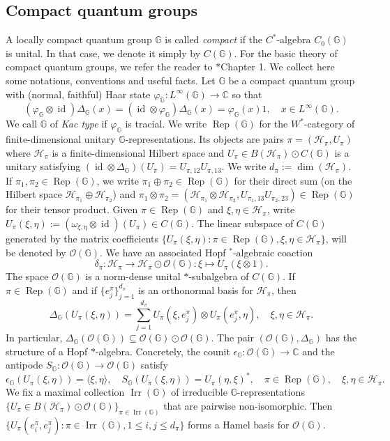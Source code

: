 \documentclass[reqno]{amsart}
\numberwithin{equation}{section}
\DeclareMathOperator{\id}{\mathrm{id}}
\DeclareMathOperator{\Rep}{\mathrm{Rep}}
\DeclareMathOperator{\Irr}{\mathrm{Irr}}
\newcommand{\mcH}{\mathcal{H}}
\newcommand{\mcO}{\mathcal{O}}
\newcommand{\C}{\mathbb{C}}
\newcommand{\G}{\mathbb{G}}
\newcommand{\mH}{\mathcal{H}}
\begin{document}
\subsection{Compact quantum groups} A locally compact quantum group $\G$ is called \emph{compact} if the $C^*$-algebra $C_0(\G)$ is unital. In that case, we denote it simply by $C(\G)$. For the basic theory of compact quantum groups, we refer the reader to \cite{NT14}*{Chapter 1}. We collect here some notations, conventions and useful facts. Let $\G$ be a compact quantum group with (normal, faithful) Haar state $\varphi_\G: L^\infty(\G)\to \C$ so that
$$(\varphi_\G\otimes \id)\Delta_\G(x)= (\id \otimes \varphi_\G)\Delta_\G(x)= \varphi_\G(x)1, \quad x\in L^\infty(\G).$$
We call $\G$ of \emph{Kac type} if $\varphi_\G$ is tracial. We write $\Rep(\G)$ for the $W^*$-category of finite-dimensional unitary $\G$-representations. Its objects are pairs $\pi= (\mcH_\pi, U_\pi)$ where $\mcH_\pi$ is a finite-dimensional Hilbert space and $U_\pi\in B(\mcH_\pi)\odot C(\G)$ is a unitary satisfying $(\id \otimes \Delta_\G)(U_\pi)= U_{\pi,12}U_{\pi,13}$. We write $d_\pi:= \dim(\mcH_\pi)$.
If $\pi_1, \pi_2 \in \Rep(\G)$, we write $\pi_1 \oplus \pi_2\in \Rep(\G)$ for their direct sum (on the Hilbert space $\mcH_{\pi_1}\oplus \mcH_{\pi_2}$) and $\pi_1 \otimes \pi_2= (\mcH_{\pi_1}\otimes \mcH_{\pi_2}, U_{\pi_1,13} U_{\pi_2,23})\in \Rep(\G)$ for their tensor product.
Given $\pi \in \Rep(\G)$ and $\xi, \eta \in \mcH_\pi$, write
$U_\pi(\xi, \eta):= (\omega_{\xi, \eta}\otimes \id)(U_\pi)\in C(\G)$. The linear subspace of $C(\G)$ generated by the matrix coefficients $\{U_\pi(\xi,\eta): \pi \in \Rep(\G), \xi, \eta \in \mcH_\pi\}$, will be denoted by $\mathcal{O}(\G)$.  We have an associated Hopf $^*$-algebraic coaction
$$\delta_\pi: \mcH_\pi\to \mcH_\pi \odot \mcO(\G): \xi \mapsto U_\pi(\xi \otimes 
1).$$ The space  $\mathcal{O}(\G)$ is a norm-dense unital $*$-subalgebra of $C(\G)$. If $\pi\in \Rep(\G)$ and if $\{e_j^\pi\}_{j=1}^{d_\pi}$ is an orthonormal basis for $\mH_\pi$, then
\begin{equation}\label{comultiplication action}
    \Delta_\G(U_\pi(\xi, \eta)) = \sum_{j=1}^{d_\pi} U_\pi(\xi, e_j^\pi)\otimes U_\pi(e_j^\pi, \eta), \quad \xi, \eta \in \mH_\pi.
\end{equation}
In particular, $\Delta_\G(\mathcal{O}(\G))\subseteq \mathcal{O}(\G)\odot \mathcal{O}(\G)$. The pair $(\mathcal{O}(\G), \Delta_\G)$ has the structure of a Hopf $*$-algebra. Concretely, the counit $\epsilon_\G: \mathcal{O}(\G)\to \mathbb{C}$ and the antipode $S_\G: \mathcal{O}(\G)\to \mathcal{O}(\G)$ satisfy
\begin{equation}\label{counit and antipode}\epsilon_\G(U_\pi(\xi, \eta))= \langle \xi, \eta\rangle, \quad S_\G(U_\pi(\xi, \eta)) = U_\pi(\eta, \xi)^*, \quad  \pi \in \Rep(\G), \quad \xi, \eta \in \mH_\pi.\end{equation}
We fix a maximal collection $\Irr(\G)$ of irreducible $\G$-representations $\{U_\pi\in B(\mathcal{H}_\pi)\odot \mathcal{O}(\G)\}_{\pi\in \Irr(\G)}$ that are pairwise non-isomorphic. Then 
$\{U_\pi(e_i^\pi, e_j^\pi): \pi\in \Irr(\G), 1 \le i,j \le d_\pi\}$
forms a Hamel basis for $\mcO(\G)$. 
\end{document}

